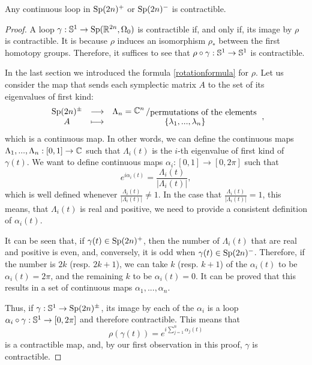 \begin{theo} \label{sppmcontractible}
Any continuous loop in $\text{Sp}(2n)^+$ or $\text{Sp}(2n)^-$ is contractible. 
\end{theo}

\begin{proof}
A loop $\gamma : \mathbb{S}^1 \rightarrow \text{Sp}(\mathbb{R}^{2n},\Omega_0)$ is contractible if, and only if, its image by $\rho$ is contractible. It is because $\rho$ induces an isomorphism $\rho_{\ast}$ between the first homotopy groups. Therefore, it suffices to see that $\rho \circ \gamma : \mathbb{S}^1 \rightarrow \mathbb{S}^1$ is contractible.

In the last section we introduced the formula \ref{rotationformula} for $\rho$. Let us consider the map that sends each symplectic matrix $A$ to the set of its eigenvalues of first kind:
\[\begin{array}{ccc} \sympl(2n)^{\pm} & \longrightarrow & \Lambda_n = \quocient{\C^n}{\text{permutations of the elements}} \\ A & \longmapsto & \{\lambda_1,...,\lambda_n\} \end{array} ,\]
which is a continuous map. In other words, we can define the continuous maps $\Lambda_1,...,\Lambda_n : [0,1] \rightarrow \mathbb{C}$ such that $\Lambda_i(t)$ is the $i$-th eigenvalue of first kind of $\gamma(t)$. We want to define continuous maps $\alpha_i : [0,1] \rightarrow [0,2\pi]$ such that
\[e^{i \alpha_i(t)} = \frac{\Lambda_i(t)}{|\Lambda_i(t)|} ,\]
which is well defined whenever $\frac{\Lambda_i(t)}{|\Lambda_i(t)|} \neq 1$. In the case that $\frac{\Lambda_i(t)}{|\Lambda_i(t)|} = 1$, this means, that $\Lambda_i(t)$ is real and positive, we need to provide a consistent definition of $\alpha_i(t)$.

It can be seen that, if $\gamma(t) \in \text{Sp}(2n)^+$, then the number of $\Lambda_i(t)$ that are real and positive is even, and, conversely, it is odd when $\gamma(t) \in \text{Sp}(2n)^-$. Therefore, if the number is $2k$ (resp. $2k+1$), we can take $k$ (resp. $k+1$) of the $\alpha_i(t)$ to be $\alpha_i(t) = 2\pi$, and the remaining $k$ to be $\alpha_i(t) = 0$. It can be proved that this results in a set of continuous maps $\alpha_1,...,\alpha_n$.

Thus, if $\gamma : \mathbb{S}^1 \rightarrow \text{Sp}(2n)^{\pm}$, its image by each of the $\alpha_i$ is a loop $\alpha_i \circ \gamma : \mathbb{S}^1 \rightarrow [0,2\pi]$ and therefore contractible. This means that
\[\rho(\gamma(t)) = e^{i \sum_{j=1}^n \alpha_j(t)}\]
is a contractible map, and, by our first observation in this proof, $\gamma$ is contractible.
\end{proof}

